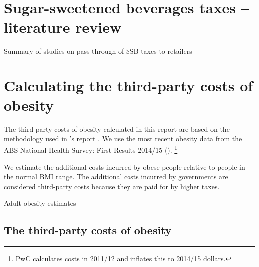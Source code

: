 \documentclass[embargoed]{grattan}
\begin{document}
\appendix

\onecolumn
\chapter{Sugar-sweetened beverages taxes -- literature review}\label{appendix-1-ssb-tax-literature-review-summary}




\begin{table}[t]
\caption{Summary of studies on pass through of SSB taxes to retailers}



\end{table}
\twocolumn

\chapter{Calculating the third-party costs of obesity }\label{appendix-2-estimating-the-third-party-costs-of-obesity}

The third-party costs of obesity calculated in this report are based on the methodology used in \citeauthor{PwC2015Weighingcostobesity}'s \citeyear{PwC2015Weighingcostobesity} report . We use the most recent obesity data from the ABS National Health Survey: First Results 2014/15 ().%
\footnote{PwC calculates costs in 2011/12 and inflates this to 2014/15 dollars.}

We estimate the additional costs incurred by obese people relative to people in the normal BMI range.
The additional costs incurred by governments are considered third-party costs because they are paid for by higher taxes.



\begin{table}
\caption{Adult obesity estimates}\label{tbl:Adult-obesity-estimates}



\end{table}

\section{The third-party costs of obesity}\label{the-third-party-costs-of-obesity}
\end{document}
